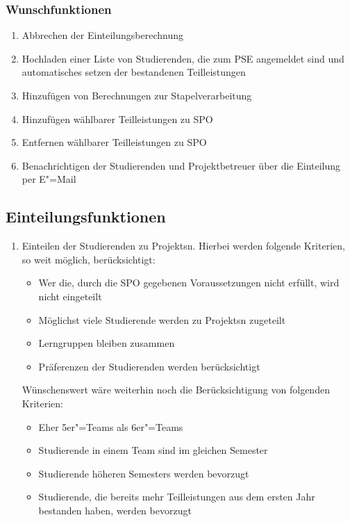 \documentclass[parskip=full]{scrartcl}
\newcommand{\swtLabel}[1]{\textbf{/#1\arabic*0/}}
\begin{document}
\subsubsection{Wunschfunktionen}

\begin{enumerate}[label=\swtLabel{FA}, resume]
  \item Abbrechen der Einteilungsberechnung \label{FAabbruch}
  \item Hochladen einer Liste von Studierenden, die zum PSE angemeldet sind
	    und automatisches setzen der bestandenen Teilleistungen \label{FAimport2}
  \item Hinzufügen von Berechnungen zur Stapelverarbeitung
  \item Hinzufügen wählbarer Teilleistungen zu SPO
  \item Entfernen wählbarer Teilleistungen zu SPO
  \item Benachrichtigen der Studierenden und Projektbetreuer über die Einteilung per E"=Mail
\end{enumerate}

\subsection{Einteilungsfunktionen}

\begin{enumerate}[label=\swtLabel{FA}, resume]
  \item Einteilen der Studierenden zu \glspl{Projekt}n. Hierbei werden folgende
  Kriterien, so weit möglich, berücksichtigt:
  \begin{itemize}
    \item Wer die, durch die \gls{SPO} gegebenen Voraussetzungen nicht erfüllt,
    wird nicht eingeteilt \label{FAeinteilung}
    \item Möglichst viele Studierende werden zu \glspl{Projekt}n zugeteilt 
    \item Lerngruppen bleiben zusammen
    \item Präferenzen der Studierenden werden berücksichtigt
  \end{itemize}
 Wünschenswert wäre weiterhin noch die Berücksichtigung von folgenden Kriterien:  
 \begin{itemize}
   \item Eher 5er"=Teams als 6er"=Teams
   \item Studierende in einem Team sind im gleichen Semester
   \item Studierende höheren Semesters werden bevorzugt
   \item Studierende, die bereits mehr Teilleistungen aus dem ersten Jahr
bestanden haben, werden bevorzugt 
 \end{itemize}
\end{enumerate}
\end{document}
